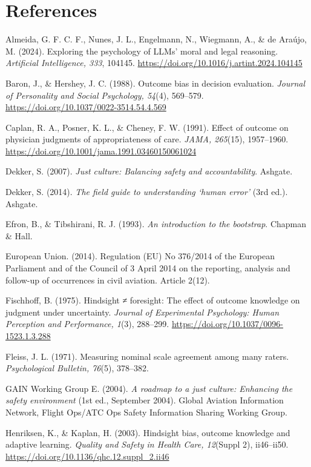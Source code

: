 \documentclass[review,12pt]{elsarticle}
\begin{document}
\section*{References}
{\setlength{\parindent}{-1.5em}\setlength{\leftskip}{1.5em}\setlength{\parskip}{3pt}
Almeida, G. F. C. F., Nunes, J. L., Engelmann, N., Wiegmann, A., \& de Araújo, M. (2024). Exploring the psychology of LLMs' moral and legal reasoning. \emph{Artificial Intelligence, 333}, 104145. \url{https://doi.org/10.1016/j.artint.2024.104145}

Baron, J., \& Hershey, J. C. (1988). Outcome bias in decision evaluation. \emph{Journal of Personality and Social Psychology, 54}(4), 569--579. \url{https://doi.org/10.1037/0022-3514.54.4.569}

Caplan, R. A., Posner, K. L., \& Cheney, F. W. (1991). Effect of outcome on physician judgments of appropriateness of care. \emph{JAMA, 265}(15), 1957--1960. \url{https://doi.org/10.1001/jama.1991.03460150061024}

Dekker, S. (2007). \emph{Just culture: Balancing safety and accountability}. Ashgate.

Dekker, S. (2014). \emph{The field guide to understanding `human error'} (3rd ed.). Ashgate.

Efron, B., \& Tibshirani, R. J. (1993). \emph{An introduction to the bootstrap}. Chapman \& Hall.

European Union. (2014). Regulation (EU) No 376/2014 of the European Parliament and of the Council of 3 April 2014 on the reporting, analysis and follow-up of occurrences in civil aviation. Article 2(12).

Fischhoff, B. (1975). Hindsight ≠ foresight: The effect of outcome knowledge on judgment under uncertainty. \emph{Journal of Experimental Psychology: Human Perception and Performance, 1}(3), 288--299. \url{https://doi.org/10.1037/0096-1523.1.3.288}

Fleiss, J. L. (1971). Measuring nominal scale agreement among many raters. \emph{Psychological Bulletin, 76}(5), 378--382.

GAIN Working Group E. (2004). \emph{A roadmap to a just culture: Enhancing the safety environment} (1st ed., September 2004). Global Aviation Information Network, Flight Ops/ATC Ops Safety Information Sharing Working Group.

Henriksen, K., \& Kaplan, H. (2003). Hindsight bias, outcome knowledge and adaptive learning. \emph{Quality and Safety in Health Care, 12}(Suppl 2), ii46--ii50. \url{https://doi.org/10.1136/qhc.12.suppl\_2.ii46}

}
\end{document}
